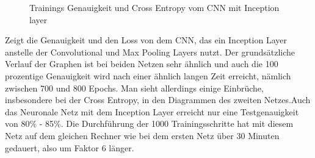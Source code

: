 \documentclass[runningheads,a4paper]{llncs}[2015/06/24]
\begin{document}
\begin{figure}
	\caption{Trainings Genauigkeit und Cross Entropy vom CNN mit Inception layer}
	\label{fig:inception_result_graph}
\end{figure}
 Zeigt die Genauigkeit und den Loss von dem CNN, das ein Inception Layer anstelle der Convolutional und Max Pooling Layers nutzt. Der grundsätzliche Verlauf der Graphen ist bei beiden Netzen sehr ähnlich und auch die 100 prozentige Genauigkeit wird nach einer ähnlich langen Zeit erreicht, nämlich zwischen 700 und 800 Epochs. Man sieht allerdings einige Einbrüche, insbesondere bei der Cross Entropy, in den Diagrammen des zweiten Netzes.Auch das Neuronale Netz mit dem Inception Layer erreicht nur eine Testgenauigkeit von 80\% - 85\%. Die Durchführung der 1000 Trainingsschritte hat mit diesem Netz auf dem gleichen Rechner wie bei dem ersten Netz über 30 Minuten gedauert, also um Faktor 6 länger.
\end{document}
